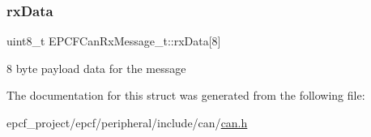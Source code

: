 \subsubsection{\texorpdfstring{rx\+Data}{rxData}}
{\footnotesize\ttfamily uint8\+\_\+t E\+P\+C\+F\+Can\+Rx\+Message\+\_\+t\+::rx\+Data\mbox{[}8\mbox{]}}

8 byte payload data for the message 

The documentation for this struct was generated from the following file\+:\begin{DoxyCompactItemize}
\item 
epcf\+\_\+project/epcf/peripheral/include/can/\mbox{\hyperlink{can_8h}{can.\+h}}\end{DoxyCompactItemize}
